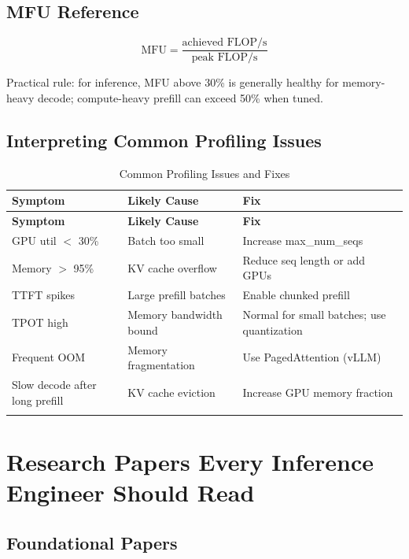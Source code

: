 \documentclass[10pt, oneside, openany]{book}
\begin{document}
\section*{MFU Reference}

\[
\text{MFU} = \frac{\text{achieved FLOP/s}}{\text{peak FLOP/s}}
\]

\noindent Practical rule: for inference, MFU above 30\% is generally healthy for memory-heavy decode; compute-heavy prefill can exceed 50\% when tuned.

\section*{Interpreting Common Profiling Issues}

\begin{longtable}{@{}p{4cm}p{4cm}p{5cm}@{}}
  \toprule
  \textbf{Symptom} & \textbf{Likely Cause} & \textbf{Fix} \\
  \midrule
  \endfirsthead
  \toprule
  \textbf{Symptom} & \textbf{Likely Cause} & \textbf{Fix} \\
  \midrule
  \endhead
  GPU util $<$ 30\% & Batch too small & Increase max\_num\_seqs \\
  Memory $>$ 95\% & KV cache overflow & Reduce seq length or add GPUs \\
  TTFT spikes & Large prefill batches & Enable chunked prefill \\
  TPOT high & Memory bandwidth bound & Normal for small batches; use quantization \\
  Frequent OOM & Memory fragmentation & Use PagedAttention (vLLM) \\
  Slow decode after long prefill & KV cache eviction & Increase GPU memory fraction \\
  \bottomrule
  \caption{Common Profiling Issues and Fixes}
\end{longtable}

\chapter{Research Papers Every Inference Engineer Should Read}
\label{app:papers}

\section*{Foundational Papers}
\end{document}
